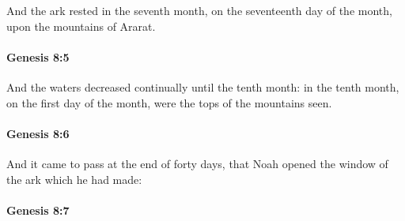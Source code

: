 			And the ark rested in the seventh month, on the seventeenth day of the month, upon the mountains of Ararat.


		\paragraph{Genesis 8:5} %
			\label{GENESIS-8-5}

			And the waters decreased continually until the tenth month: in the tenth month, on the first day of the month, were the tops of the mountains seen.


		\paragraph{Genesis 8:6} %
			\label{GENESIS-8-6}

			And it came to pass at the end of forty days, that Noah opened the window of the ark which he had made:


		\paragraph{Genesis 8:7} %
			\label{GENESIS-8-7}

